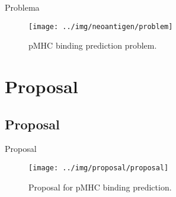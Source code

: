 \documentclass[10pt]{beamer}
\newcommand{\1}{
	\setbeamertemplate{background}{
		\texttt{[image: img/1]}
		\tikz[overlay] \fill[fill opacity=0.75,fill=white] (0,0) rectangle (-\paperwidth,\paperheight);
	}
}
\begin{document}
\begin{frame}{Problema}{}	
	\begin{figure}
		\texttt{[image: ../img/neoantigen/problem]}
		\caption{pMHC binding prediction problem.}
	\end{figure}
\end{frame}



\section{Proposal}

\subsection{Proposal}

\begin{frame}{Proposal}{}
	
	\vspace{0.5cm}
	\begin{figure}[H]
		\centering
		\texttt{[image: ../img/proposal/proposal]}	
		\caption{Proposal for pMHC binding prediction.}
		\label{fig:neo_det_seq}
	\end{figure}
\end{frame}
\end{document}

